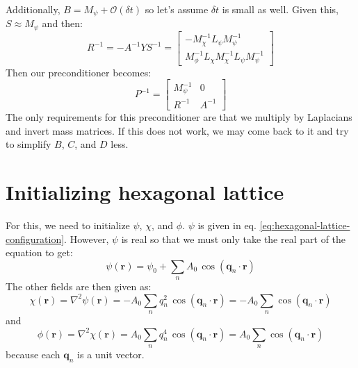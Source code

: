 \documentclass[reqno]{article}
\begin{document}
Additionally, $B = M_\psi + \mathcal{O}(\delta t)$ so let's assume $\delta t$ is small as well.
Given this, $S \approx M_\psi$ and then:
\begin{equation}
    R^{-1}
    =
    -A^{-1} Y S^{-1}
    =
    \begin{bmatrix}
        -M_\chi^{-1} L_\psi M_\psi^{-1} \\
        M_\phi^{-1} L_\chi M_\chi^{-1} L_\psi M_\psi^{-1}
    \end{bmatrix}
\end{equation}
Then our preconditioner becomes:
\begin{equation}
    P^{-1}
    =
    \begin{bmatrix}
        M_\psi^{-1} &0 \\
        R^{-1} &A^{-1}
    \end{bmatrix}
\end{equation}
The only requirements for this preconditioner are that we multiply by Laplacians and invert mass matrices.
If this does not work, we may come back to it and try to simplify $B$, $C$, and $D$ less.

\section{Initializing hexagonal lattice}

For this, we need to initialize $\psi$, $\chi$, and $\phi$.
$\psi$ is given in eq. \eqref{eq:hexagonal-lattice-configuration}.
However, $\psi$ is real so that we must only take the real part of the equation to get:
\begin{equation}
    \psi\left(\mathbf{r}\right)
    =
    \psi_0
    + \sum_n A_0 \, \cos \left(\mathbf{q}_n \cdot \mathbf{r} \right)
\end{equation}
The other fields are then given as:
\begin{equation}
    \chi(\mathbf{r})
    =
    \nabla^2 \psi(\mathbf{r})
    =
    - A_0 \sum_n q_n^2 \, \cos \left(\mathbf{q}_n \cdot \mathbf{r} \right)
    = 
    - A_0 \sum_n \cos \left(\mathbf{q}_n \cdot \mathbf{r} \right) 
\end{equation}
and
\begin{equation}
    \phi(\mathbf{r})
    =
    \nabla^2 \chi(\mathbf{r})
    =
    A_0 \sum_n q_n^4 \, \cos \left(\mathbf{q}_n \cdot \mathbf{r} \right) 
    =
    A_0 \sum_n \cos \left(\mathbf{q}_n \cdot \mathbf{r} \right) 
\end{equation}
because each $\mathbf{q}_n$ is a unit vector.
\end{document}
